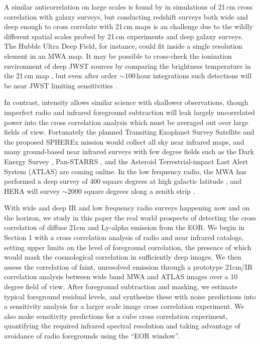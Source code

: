 \documentclass[preprint]{aastex}
\begin{document}
A similar anticorrelation on large scales is found by \citet{lidz09,park14} in simulations of 21\,cm cross correlation with galaxy surveys, but conducting redshift surveys both wide and deep enough to cross correlate with 21\,cm maps is an  challenge due to the wildly different spatial scales probed by 21\,cm experiments and deep galaxy surveys. The Hubble Ultra Deep Field, for instance, could fit inside a single resolution element in an MWA map. It may be possible to cross-check the ionization environment of deep JWST sources by comparing the brightness temperature in the 21\,cm map \citep{beardsley15}, but even after order $\sim100$\,hour integrations such detections will be near JWST limiting sensitivities \citet{zackrisson11}.

In contrast, intensity allows similar science with shallower observations, though imperfect radio and infrared foreground subtraction will leak largely uncorrelated power into the cross correlation analysis which must be averaged out over large fields of view. Fortunately the planned Transiting Exoplanet Survey Satellite \citep{ricker14} and the proposed SPHEREx mission \citep{ScienceWithSpherex,SpherexWhitePaper} would collect all sky near infrared maps, and many ground-based near infrared surveys with few degree fields such as the Dark Energy Survey \citep{des16}, Pan-STARRS \citep{tonry12}, and the Asteroid Terrestrial-impact Last Alert System (ATLAS) \citep{tonry11} are coming online. In the low frequency radio, the MWA has performed a deep survey of 400 square degrees at high galactic latitude \citep{beardsley16}, and HERA will survey $\sim2000$ square degrees along a zenith strip \citep{dillonmapmaking}. 

With wide and deep IR and low frequency radio surveys happening now and on the horizon, we study in this paper the real world prospects of detecting the cross correlation of diffuse 21cm and Ly-alpha emission from the EOR. We begin in Section 1 with a cross correlation analysis of radio and near infrared catalogs, setting upper limits on the level of foreground correlation, the presence of which would mask the cosmological correlation in sufficiently deep images. We then assess the correlation of faint, unresolved emission through a prototype 21cm/IR correlation analysis between wide band MWA and ATLAS images over a 10 degree field of view. After foreground subtraction and masking, we estimate typical foreground residual levels, and synthesize these with noise predictions into a sensitivity analysis for a larger scale image cross correlation experiment. We also make sensitivity predictions for a cube cross correlation experiment, quantifying the required infrared spectral resolution and taking advantage of avoidance of radio foregrounds using the ``EOR window''.
\end{document}
